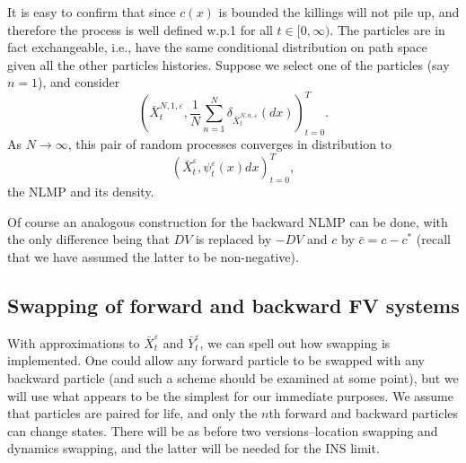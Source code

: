 \documentclass[english,11pt]{article}%
\numberwithin{equation}{section}
\numberwithin{example}{section}
\numberwithin{theorem}{section}
\begin{document}
It is easy to confirm that since $c(x)$ is bounded the killings will not pile
up, and therefore the process is well defined w.p.1 for all $t\in
\lbrack0,\infty)$. The particles are in fact exchangeable, i.e., have the same
conditional distribution on path space given all the other particles
histories. Suppose we select one of the particles (say $n=1$), and consider
\[
\left(  \bar{X}_{t}^{N,1,\varepsilon},\frac{1}{N}\sum_{n=1}^{N}\delta_{\bar
{X}_{t}^{N,n,\varepsilon}}(dx)\right)  _{t=0}^{T}.
\]
As $N\rightarrow\infty$, this pair of random processes converges in
distribution to
\[
\left(  \bar{X}_{t}^{\varepsilon},\psi_{t}^{\varepsilon}(x)dx\right)
_{t=0}^{T},
\]
the NLMP and its density. 

Of course an analogous construction for the backward NLMP can be done, with
the only difference being that $DV$ is replaced by $-DV$ and $c$ by $\bar
{c}=c-c^{\ast}$ (recall that we have assumed the latter to be non-negative).

\subsection{Swapping of forward and backward FV systems}

With approximations to $\bar{X}_{t}^{\varepsilon}$ and $\bar{Y}_{t}%
^{\varepsilon}$, we can spell out how swapping is implemented. One could allow
any forward particle to be swapped with any backward particle (and such a
scheme should be examined at some point), but we will use what appears to be
the simplest for our immediate purposes. We assume that particles are paired
for life, and only the $n$th forward and backward particles can change states.
There will be as before two versions--location swapping and dynamics swapping,
and the latter will be needed for the INS limit.
\end{document}
